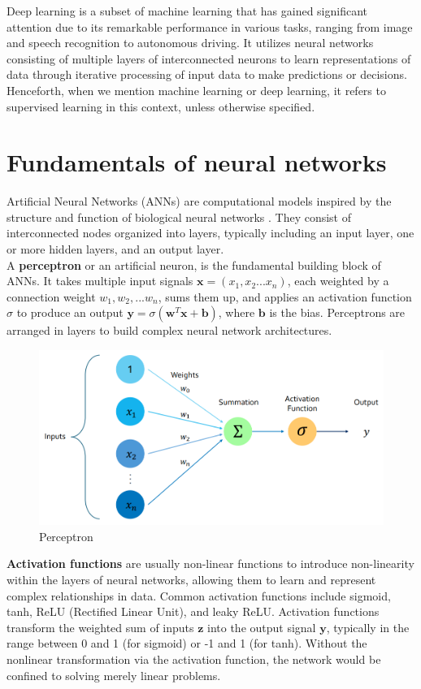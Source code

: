 Deep learning is a subset of machine learning that has gained significant attention due to its remarkable performance in various tasks, ranging from image and speech recognition to autonomous driving. It utilizes neural networks consisting of multiple layers of interconnected neurons to learn representations of data through iterative processing of input data to make predictions or decisions. Henceforth, when we mention machine learning or deep learning, it refers to supervised learning in this context, unless otherwise specified.
\section{Fundamentals of neural networks}
Artificial Neural Networks (ANNs) are computational models inspired by the structure and function of biological neural networks \cite{rumel}. They consist of interconnected nodes organized into layers, typically including an input layer, one or more hidden layers, and an output layer. \\ 
A \textbf{perceptron} or an artificial neuron, is the fundamental building block of ANNs. It takes multiple input signals $\mathbf{x}= \left(x_1, x_2 ...x_n\right)$, each weighted by a connection weight $w_1,w_2,...w_n$, sums them up, and applies an activation function $\sigma$ to produce an output $\mathbf{y} = \sigma \left(\mathbf{w}^T\mathbf{x} + \mathbf{b} \right)$, where $\mathbf{b}$ is the bias. Perceptrons are arranged in layers to build complex neural network architectures.\\
\begin{figure}[ht]
    \centering
    \includegraphics[width=12cm]{images/Theory-DL/ActFn.png}
    \caption{Perceptron}
    \label{fig:Perceptron}
  \end{figure}
\textbf{Activation functions} are usually non-linear functions to introduce non-linearity within the layers of neural networks, allowing them to learn and represent complex relationships in data. Common activation functions include sigmoid, tanh, ReLU (Rectified Linear Unit), and leaky ReLU. Activation functions transform the weighted sum of inputs $\mathbf{z}$ into the output signal $\mathbf{y}$, typically in the range between 0 and 1 (for sigmoid) or -1 and 1 (for tanh). Without the nonlinear transformation via the activation function, the network would be confined to solving merely linear problems. \\
